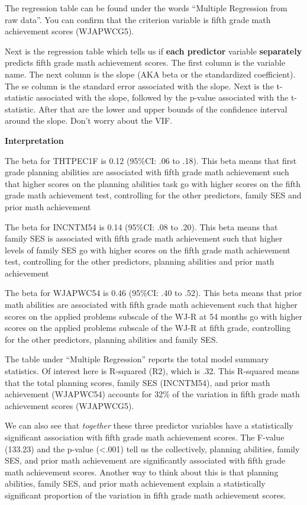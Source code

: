 \documentclass[
]{book}
\begin{document}
The regression table can be found under the words ``Multiple Regression from raw data''. You can confirm that the criterion variable is fifth grade math achievement scores (WJAPWCG5).

Next is the regression table which tells us if \textbf{each predictor} variable \textbf{separately} predicts fifth grade math achievement scores. The first column is the variable name. The next column is the slope (AKA beta or the standardized coefficient). The se column is the standard error associated with the slope. Next is the t-statistic associated with the slope, followed by the p-value associated with the t-statistic. After that are the lower and upper bounds of the confidence interval around the slope. Don't worry about the VIF.

\textbf{Interpretation}

The beta for THTPEC1F is 0.12 (95\%CI: .06 to .18). This beta means that first grade planning abilities are associated with fifth grade math achievement such that higher scores on the planning abilities task go with higher scores on the fifth grade math achievement test, controlling for the other predictors, family SES and prior math achievement

The beta for INCNTM54 is 0.14 (95\%CI: .08 to .20). This beta means that family SES is associated with fifth grade math achievement such that higher levels of family SES go with higher scores on the fifth grade math achievement test, controlling for the other predictors, planning abilities and prior math achievement

The beta for WJAPWC54 is 0.46 (95\%CI: .40 to .52). This beta means that prior math abilities are associated with fifth grade math achievement such that higher scores on the applied problems subscale of the WJ-R at 54 months go with higher scores on the applied problems subscale of the WJ-R at fifth grade, controlling for the other predictors, planning abilities and family SES.

The table under ``Multiple Regression'' reports the total model summary statistics. Of interest here is R-squared (R2), which is .32. This R-squared means that the total planning scores, family SES (INCNTM54), and prior math achievement (WJAPWC54) accounts for 32\% of the variation in fifth grade math achievement scores (WJAPWCG5).

We can also see that \emph{together} these three predictor variables have a statistically significant association with fifth grade math achievement scores. The F-value (133.23) and the p-value (\textless.001) tell us the collectively, planning abilities, family SES, and prior math achievement are significantly associated with fifth grade math achievement scores. Another way to think about this is that planning abilities, family SES, and prior math achievement explain a statistically significant proportion of the variation in fifth grade math achievement scores.
\end{document}
